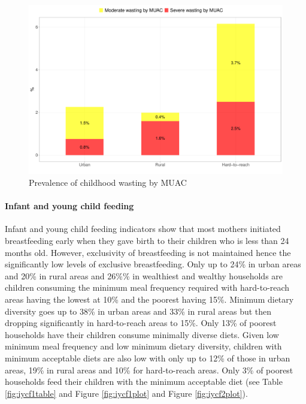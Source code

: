 \documentclass[12pt,a4paper]{article}
\let\oldparagraph\paragraph
\renewcommand{\paragraph}[1]{\oldparagraph{#1}\mbox{}}
\begin{document}
\begin{figure}[H]

{\centering \includegraphics{kayinReport_files/figure-latex/muacPlot-1} 

}

\caption{Prevalence of childhood wasting by MUAC}\label{fig:muacPlot}
\end{figure}

\hypertarget{iycf-results}{%
\paragraph{Infant and young child feeding}\label{iycf-results}}

Infant and young child feeding indicators show that most mothers initiated breastfeeding early when they gave birth to their children who is less than 24 months old. However, exclusivity of breastfeeding is not maintained hence the significantly low levels of exclusive breastfeeding. Only up to 24\% in urban areas and 20\% in rural areas and 26\%\% in wealthiest and wealthy households are children consuming the minimum meal frequency required with hard-to-reach areas having the lowest at 10\% and the poorest having 15\%. Minimum dietary diversity goes up to 38\% in urban areas and 33\% in rural areas but then dropping significantly in hard-to-reach areas to 15\%. Only 13\% of poorest households have their children consume minimally diverse diets. Given low minimum meal frequency and low minimum dietary diversity, children with minimum acceptable diets are also low with only up to 12\% of those in urban areas, 19\% in rural areas and 10\% for hard-to-reach areas. Only 3\% of poorest households feed their children with the minimum acceptable diet (see Table \ref{fig:iycf1table} and Figure \ref{fig:iycf1plot} and Figure \ref{fig:iycf2plot}).
\end{document}
